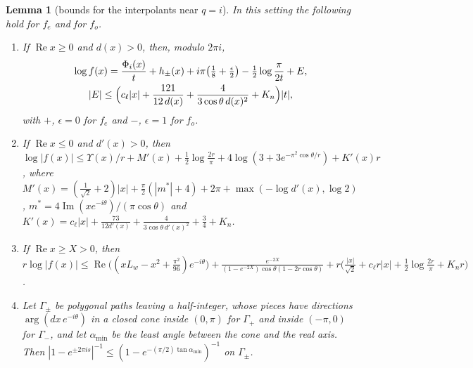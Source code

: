 \documentclass[11pt]{article}
\theoremstyle{plain}
\newtheorem{lemma}[theorem]{Lemma}
\theoremstyle{definition}
\theoremstyle{remark}
\theoremstyle{plain}\newtheorem*{maintheorem}{Main Theorem}
\begin{document}
\begin{lemma}[bounds for the interpolants near $q=i$]\label{lem:qi-bounds}
In this setting the following hold for $f_e$ and for $f_o$.
\begin{enumerate}[label=\textup{(\roman*)},leftmargin=2.2em,itemsep=0.1em,topsep=0.2em]
\item If $\operatorname{Re}x\ge0$ and $d(x)>0$, then, modulo $2\pi i$,
\begin{gather*}
 \log f(x)=\frac{\Phi_i(x)}t+h_\pm(x)+i\pi\bigl(\tfrac18+\tfrac\epsilon2\bigr)-\tfrac12\log\frac{\pi}{2t}+E,\\
 |E|\le\Bigl(c_\ell|x|+\frac{121}{12\,d(x)}+\frac{4}{3\cos\theta\,d(x)^2}+K_n\Bigr)|t|,
\end{gather*}
with $+$, $\epsilon=0$ for $f_e$ and $-$, $\epsilon=1$ for $f_o$.
\item If $\operatorname{Re}x\le0$ and $d'(x)>0$, then
$\log|f(x)|\le\Upsilon(x)/r+M'(x)+\frac12\log\frac{2r}\pi+4\log(3+3e^{-\pi^2\cos\theta/r})+K'(x)r$, where
$M'(x)=(\frac1{\sqrt2}+2)|x|+\frac\pi2(|m^\ast|+4)+2\pi+\max(-\log d'(x),\log2)$,
$m^\ast=4\operatorname{Im}(xe^{-i\theta})/(\pi\cos\theta)$ and
$K'(x)=c_\ell|x|+\frac{73}{12d'(x)}+\frac4{3\cos\theta\,d'(x)^2}+\frac34+K_n$.
\item If $\operatorname{Re}x\ge X>0$, then $r\log|f(x)|\le\operatorname{Re}\bigl((xL_w-x^2+\frac{\pi^2}{96})e^{-i\theta}\bigr)
+\frac{e^{-2X}}{(1-e^{-2X})\cos\theta(1-2r\cos\theta)}+r\bigl(\frac{|x|}{\sqrt2}+c_\ell r|x|+\frac12\log\frac{2r}\pi+K_nr\bigr)$.
\item Let $\Gamma_\pm$ be polygonal paths leaving a half-integer, whose pieces have directions
$\arg(dx\,e^{-i\theta})$ in a closed cone inside $(0,\pi)$ for $\Gamma_+$ and inside $(-\pi,0)$ for
$\Gamma_-$, and let $\alpha_{\min}$ be the least angle between the cone and the real axis. Then
$|1-e^{\pm2\pi is}|^{-1}\le(1-e^{-(\pi/2)\tan\alpha_{\min}})^{-1}$ on $\Gamma_\pm$.
\end{enumerate}
\end{lemma}
\end{document}

